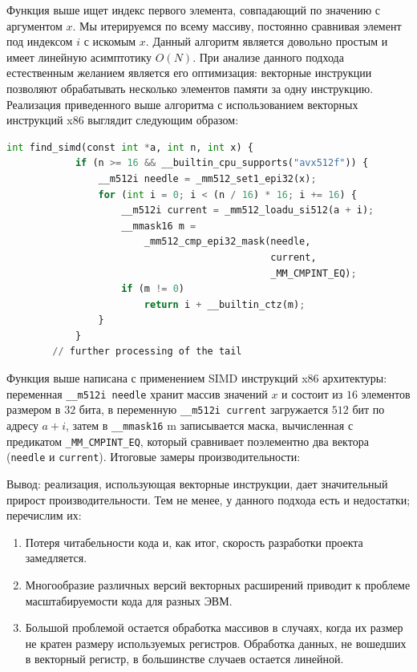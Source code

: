 \documentclass[a4paper, 12pt]{article}
\begin{document}
    Функция выше ищет индекс первого элемента, совпадающий по значению с аргументом $x$. Мы итерируемся
    по всему массиву, постоянно сравнивая элемент под индексом $i$ с искомым $x$. Данный алгоритм является
    довольно простым и имеет линейную асимптотику $O (N)$. При анализе данного подхода естественным желанием
    является его оптимизация: векторные инструкции позволяют обрабатывать несколько элементов памяти за одну инструкцию. Реализация приведенного выше алгоритма с 
    использованием векторных инструкций x$86$ выглядит следующим образом:

    \begin{lstlisting}[language=Python, caption=SIMD example]
        int find_simd(const int *a, int n, int x) {
            if (n >= 16 && __builtin_cpu_supports("avx512f")) {
                __m512i needle = _mm512_set1_epi32(x);
                for (int i = 0; i < (n / 16) * 16; i += 16) {
                    __m512i current = _mm512_loadu_si512(a + i);
                    __mmask16 m =
                        _mm512_cmp_epi32_mask(needle, 
                                              current, 
                                              _MM_CMPINT_EQ);
                    if (m != 0)
                        return i + __builtin_ctz(m);
                }
            }
        // further processing of the tail
    \end{lstlisting}

    Функция выше написана с применением SIMD инструкций x86 архитектуры: переменная \texttt{\_\_m512i needle} хранит массив
    значений $x$ и состоит из $16$ элементов размером в $32$ бита, в переменную \texttt{\_\_m512i current} загружается $512$
    бит по адресу $a + i$, затем в \texttt{\_\_mmask16} m записывается маска, вычисленная с предикатом \texttt{\_MM\_CMPINT\_EQ}, который
    сравнивает поэлементно два вектора (\texttt{needle} и \texttt{current}). Итоговые замеры производительности:
    
    
    Вывод: реализация, использующая векторные инструкции, дает значительный прирост 
    производительности. Тем не менее, у данного подхода есть и недостатки; перечислим их:

    \begin{enumerate}
        \item Потеря читабельности кода и, как итог, скорость разработки проекта замедляется. 
        \item Многообразие различных версий векторных расширений приводит к проблеме масштабируемости кода для разных ЭВМ.  
        \item Большой проблемой остается обработка массивов в случаях, когда их размер не кратен размеру
        используемых регистров. Обработка данных, не вошедших в векторный регистр, в большинстве случаев остается линейной.
    \end{enumerate}
\end{document}
